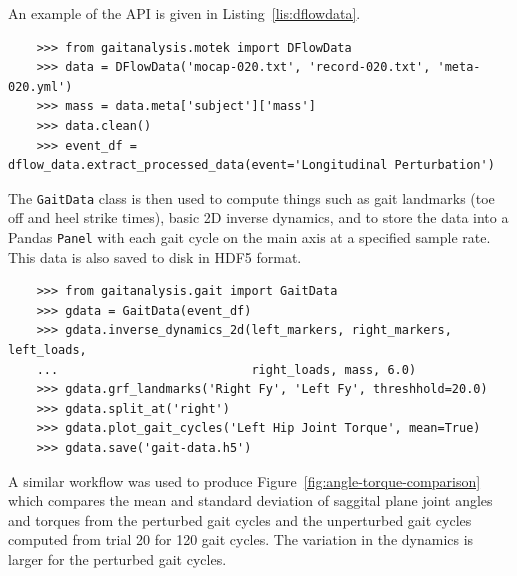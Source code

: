 \documentclass[10pt,a4paper,twocolumn]{article}
\begin{document}
An example of the API is given in Listing~\ref{lis:dflowdata}.

\begin{listing*}
  \begin{verbatim}
    >>> from gaitanalysis.motek import DFlowData
    >>> data = DFlowData('mocap-020.txt', 'record-020.txt', 'meta-020.yml')
    >>> mass = data.meta['subject']['mass']
    >>> data.clean()
    >>> event_df = dflow_data.extract_processed_data(event='Longitudinal Perturbation')
  \end{verbatim}
  \cprotect\caption{Python interpreter session showing how one could load a
    trial into memory, extract the subject's mass from the meta data, run the
    data cleaning process, and finally extract a Pandas \verb|DataFrame|
    containing all of the time histories for a specific event in the trial.}
  \label{lis:dflowdata}
\end{listing*}

The \verb|GaitData| class is then used to compute things such as gait landmarks
(toe off and heel strike times), basic 2D inverse dynamics, and to store the
data into a Pandas \verb|Panel| with each gait cycle on the main axis at a
specified sample rate. This data is also saved to disk in HDF5 format.

\begin{listing*}
  \begin{verbatim}
    >>> from gaitanalysis.gait import GaitData
    >>> gdata = GaitData(event_df)
    >>> gdata.inverse_dynamics_2d(left_markers, right_markers, left_loads,
    ...                           right_loads, mass, 6.0)
    >>> gdata.grf_landmarks('Right Fy', 'Left Fy', threshhold=20.0)
    >>> gdata.split_at('right')
    >>> gdata.plot_gait_cycles('Left Hip Joint Torque', mean=True)
    >>> gdata.save('gait-data.h5')
  \end{verbatim}
  \cprotect\caption{Python interpreter session showing how one could compute
    the inverse dynamics (joint angles and torques), indentify the gait
    landmarks (e.g. heelstrikes), split the data with respect to the gait
    landmarks in a Pandas \verb|Panel|, plot the mean and standard deviation of
    one time history with respect to the gait cycles, and save the data to disk.}
  \label{lis:dflowdata}
\end{listing*}

A similar workflow was used to produce Figure~\ref{fig:angle-torque-comparison}
which compares the mean and standard deviation of saggital plane joint angles
and torques from the perturbed gait cycles and the unperturbed gait cycles
computed from trial 20 for 120 gait cycles. The variation in the dynamics is
larger for the perturbed gait cycles.
\end{document}
